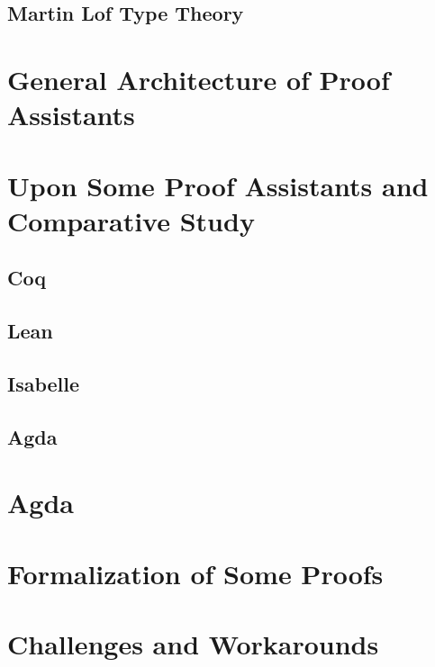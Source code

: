 \documentclass[12pt]{article}
\begin{document}
 \subsection{Martin Lof Type Theory }









\section{General Architecture of Proof Assistants}

\section{Upon Some Proof Assistants and Comparative Study}
\subsection{Coq}

\subsection{Lean}

\subsection{Isabelle}

\subsection{Agda}


\section{ Agda}


\section{Formalization of Some Proofs}



\section{Challenges and Workarounds}





 

\end{document}
